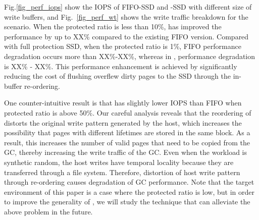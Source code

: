 Fig.\ref{fig_perf_iops} show the IOPS of FIFO-SSD and \ours{}-SSD with different size of write buffers, and Fig.~\ref{fig_perf_wt} shows the write traffic breakdown for the scenario.
When the protected ratio is less than 10\%, \ours{} has improved the performance by up to XX\% compared to the existing FIFO version.
Compared with full protection SSD, when the protected ratio is 1\%, FIFO performance degradation occurs more than XX\%-XX\%, whereas in \ours{}, performance degradation is XX\% - XX\%. This performance enhancement is achieved by significantly reducing the cost of flushing overflew dirty pages to the SSD through the in-buffer re-ordering.

One counter-intuitive result is that \ours{} has slightly lower IOPS than FIFO when protected ratio is above 50\%. Our careful analysis reveals that the reordering of \ours{} distorts the original write pattern generated by the host, which increases the possibility that pages with different lifetimes are stored in the same block. As a result, this increases the number of valid pages that need to be copied from the GC, thereby increasing the write traffic of the GC. Even when the workload is synthetic random, the host writes have temporal locality because they are transferred through a file system. Therefore, distortion of host write pattern through re-ordering causes degradation of GC performance. Note that the target environment of this paper is a case where the protected ratio is low, but in order to improve the generality of \ours{}, we will study the technique that can alleviate the above problem in the future.



